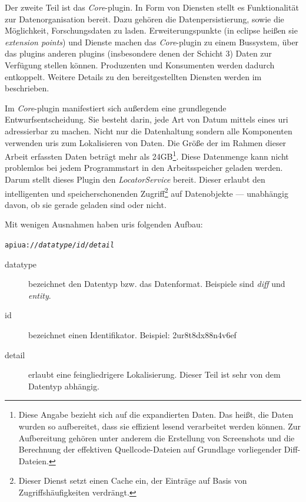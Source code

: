 Der zweite Teil ist das \textit{Core}-\gls{plugin}. In Form von Diensten stellt es Funktionalität zur Datenorganisation bereit. Dazu gehören die Datenpersistierung, sowie die Möglichkeit, Forschungsdaten zu laden. Erweiterungspunkte (in \gls{eclipse} heißen sie \textit{extension points}) und Dienste machen das \textit{Core}-\gls{plugin} zu einem Bussystem, über das \glspl{plugin} anderen \glspl{plugin} (insbesondere denen der Schicht 3) Daten zur Verfügung stellen können. Produzenten und Konsumenten werden dadurch entkoppelt. Weitere Details zu den bereitgestellten Diensten werden im  beschrieben.

Im \textit{Core}-\gls{plugin} manifestiert sich außerdem eine grundlegende Entwurfsentscheidung. Sie besteht darin, jede Art von Datum mittels eines \gls{uri} adressierbar zu machen. Nicht nur die Datenhaltung sondern alle Komponenten verwenden \gls{uri}s zum Lokalisieren von Daten. Die Größe der im Rahmen dieser Arbeit erfassten Daten beträgt mehr als 24GB\footnote{Diese Angabe bezieht sich auf die expandierten Daten. Das heißt, die Daten wurden so aufbereitet, dass sie effizient lesend verarbeitet werden können. Zur Aufbereitung gehören unter anderem die Erstellung von Screenshots und die Berechnung der effektiven Quellcode-Dateien auf Grundlage vorliegender Diff-Dateien.}. Diese Datenmenge kann nicht problemlos bei jedem Programmstart in den Arbeitsspeicher geladen werden. Darum stellt dieses Plugin den \textit{LocatorService} bereit. Dieser erlaubt den intelligenten und speicherschonenden Zugriff\footnote{Dieser Dienst setzt einen Cache ein, der Einträge auf Basis von Zugriffshäufigkeiten verdrängt.} auf Datenobjekte --- unabhängig davon, ob sie gerade geladen sind oder nicht.

Mit wenigen Ausnahmen haben \gls{uri}s folgenden Aufbau:

\begin{center}\texttt{apiua://\textit{datatype}/\textit{id}/\textit{detail}}\end{center}

\bigskip

\begin{description}
	\item[datatype] bezeichnet den Datentyp bzw. das Datenformat. Beispiele sind \textit{diff} und \textit{entity}.
	\item[id] bezeichnet einen Identifikator. Beispiel: 2ur8t8dx88n4v6ef
	\item[detail] erlaubt eine feingliedrigere Lokalisierung. Dieser Teil ist sehr von dem Datentyp abhängig.
\end{description}

